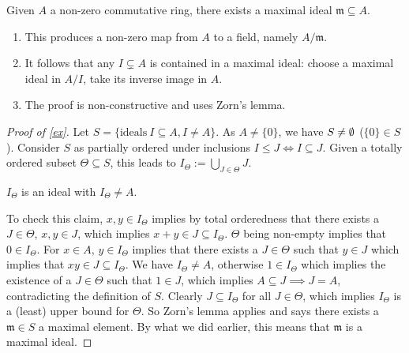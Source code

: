 \begin{prop}\label{ex} 
    Given $A$ a non-zero commutative ring, there exists a maximal ideal $\mathfrak m \subseteq A$.
\end{prop}
\begin{remark}\hspace{0.2cm} 

   \begin{enumerate}[label=(\arabic*)]
   \setlength\itemsep{-.2em}
       \item This produces a non-zero map from $A$ to a field, namely $A / \mathfrak m$.
        \item It follows that any $I \subsetneq A$ is contained in a maximal ideal: choose a maximal ideal in $A / I$, take its inverse image in $A$.
        \item The proof is non-constructive and uses Zorn's lemma.
   \end{enumerate} 
\end{remark}
\begin{proof}[Proof of \cref{ex}]
    Let $S= \{ \text{ideals} \ I \subseteq A, I \neq A\} $. As $A \neq \{0\} $, we have $S \neq \emptyset$ ($\{0\} \in S$). Consider $S$ as partially ordered under inclusions $I \leq J \iff I \subseteq J$. Given a totally ordered subset $\Theta \subseteq S$, this leads to $I _{\Theta}:= \bigcup_{J \in \Theta} J$. 
    \begin{claim}
        $I_{\Theta}$ is an ideal with $I_{\Theta}\neq A$.
    \end{claim}
    To check this claim, $x, y \in I_{\Theta}$ implies by total orderedness that there exists a  $J \in \Theta$, $x,y \in J$, which implies $x+y \in J \subseteq I _{\Theta}$. $\Theta$ being non-empty implies that $0 \in I _{\Theta}$. For $x \in A$, $y \in I_{\Theta}$ implies that there exists a $J \in \Theta$ such that $y \in J$ which implies that $xy \in J \subseteq I _{\Theta}$. We have $I_{\Theta}\neq A$, otherwise $1 \in I _{\Theta}$ which implies the existence of a $J \in \Theta$ such that $1 \in J$, which implies $A \subseteq J \implies  J=A$, contradicting the definition of $S$. Clearly $J \subseteq I_{\Theta}$ for all $J \in \Theta$, which implies $I_{\Theta}$ is a (least) upper bound for $\Theta$. So Zorn's lemma applies and says there exists a $\mathfrak  m \in S$ a maximal element. By what we did earlier, this means that $\mathfrak m$ is a maximal ideal.
\end{proof}
